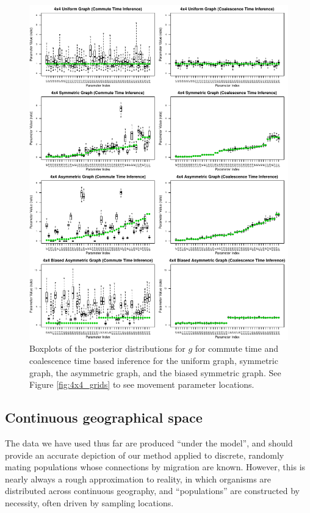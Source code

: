 \documentclass{article}
\begin{document}
\begin{figure}
\centering
     \includegraphics[scale=.8]{figs/4x4box}
    \caption{Boxplots of the posterior distributions for $g$ for commute time and coalescence time
    based inference for the uniform graph, symmetric graph, 
    the asymmetric graph, and the biased symmetric graph.
    See Figure \ref{fig:4x4_grids} to see movement parameter locations.}
    \label{fig:4x4box}
\end{figure}


\subsection*{Continuous geographical space}

The data we have used thus far are produced ``under the model'',
and should provide an accurate depiction of our method applied to discrete, randomly mating populations
whose connections by migration are known.
However, this is nearly always a rough approximation to reality,
in which organisms are distributed across continuous geography,
and ``populations'' are constructed by necessity, often driven by sampling locations.
\end{document}
